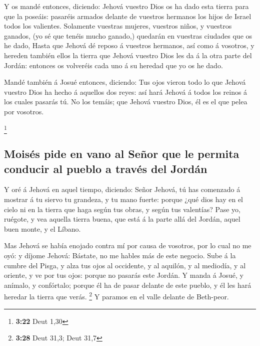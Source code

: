  Y os mandé entonces, diciendo: Jehová vuestro Dios os ha
dado esta tierra para que la poseáis: pasaréis armados delante de
vuestros hermanos los hijos de Israel todos los valientes.
 Solamente vuestras mujeres, vuestros niños, y vuestros
ganados, (yo sé que tenéis mucho ganado,) quedarán en vuestras ciudades
que os he dado,  Hasta que Jehová dé reposo á vuestros
hermanos, así como á vosotros, y hereden también ellos la tierra que
Jehová vuestro Dios les da á la otra parte del Jordán: entonces os
volveréis cada uno á su heredad que yo os he dado.

 Mandé también á Josué entonces, diciendo: Tus ojos
vieron todo lo que Jehová vuestro Dios ha hecho á aquellos dos reyes:
así hará Jehová á todos los reinos á los cuales pasarás tú.
 No los temáis; que Jehová vuestro Dios, él es el que
pelea por vosotros.

\footnote{\textbf{3:22} Deut 1,30}

\hypertarget{moisuxe9s-pide-en-vano-al-seuxf1or-que-le-permita-conducir-al-pueblo-a-travuxe9s-del-jorduxe1n}{%
\subsection{Moisés pide en vano al Señor que le permita conducir al
pueblo a través del
Jordán}\label{moisuxe9s-pide-en-vano-al-seuxf1or-que-le-permita-conducir-al-pueblo-a-travuxe9s-del-jorduxe1n}}

 Y oré á Jehová en aquel tiempo, diciendo:
 Señor Jehová, tú has comenzado á mostrar á tu siervo tu
grandeza, y tu mano fuerte: porque ¿qué dios hay en el cielo ni en la
tierra que haga según tus obras, y según tus valentías? 
Pase yo, ruégote, y vea aquella tierra buena, que está á la parte allá
del Jordán, aquel buen monte, y el Líbano.

 Mas Jehová se había enojado contra mí por causa de
vosotros, por lo cual no me oyó: y díjome Jehová: Bástate, no me hables
más de este negocio.  Sube á la cumbre del Pisga, y alza
tus ojos al occidente, y al aquilón, y al mediodía, y al oriente, y ve
por tus ojos: porque no pasarás este Jordán.  Y manda á
Josué, y anímalo, y confórtalo; porque él ha de pasar delante de este
pueblo, y él les hará heredar la tierra que verás. \footnote{\textbf{3:28}
  Deut 31,3; Deut 31,7}  Y paramos en el valle delante de
Beth-peor.

